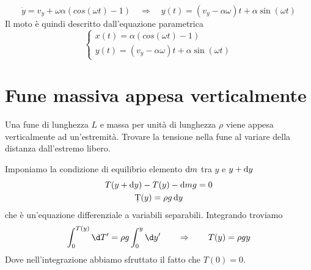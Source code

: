 \begin{sol}
\begin{enumerate}
		\begin{equation}
			\dot{y} = v_y + \omega \alpha (cos(\omega t) - 1) \quad \Rightarrow \quad y(t) = (v_y - \alpha \omega) t + \alpha \sin(\omega t)
		\end{equation}
		Il moto è quindi descritto dall'equazione parametrica
		\begin{equation}
		\begin{cases}
			x(t) = \alpha (cos(\omega t) - 1) \\
			y(t) = (v_y - \alpha \omega) t + \alpha \sin(\omega t)
		\end{cases}
		\end{equation}
	\end{enumerate}
\end{sol}

\section{Fune massiva appesa verticalmente}
\begin{testo}
	Una fune di lunghezza $ L $ e massa per unità di lunghezza $ \rho $ viene appesa verticalmente ad un'estremità. Trovare la tensione nella fune al variare della distanza dall'estremo libero. 
\end{testo}
\begin{sol}
	Imponiamo la condizione di equilibrio elemento $ \dif{m} $ tra $ y $ e $ y + \dif{y} $ 
	\begin{gather*}
	T(y + \dif{y}) - T(y) - \dif{m} g = 0 \\
	\d T(y) = \rho g \dif{y}
	\end{gather*}
	 che è un'equazione differenziale a variabili separabili. Integrando troviamo
	\begin{equation}
	\int_{0}^{T(y)} \d T' = \rho g \int_{0}^{y} \d y' \qquad \Rightarrow \qquad	T(y) = \rho g y
	\end{equation}
	Dove nell'integrazione abbiamo sfruttato il fatto che $ T(0) = 0 $. 
\end{sol}

